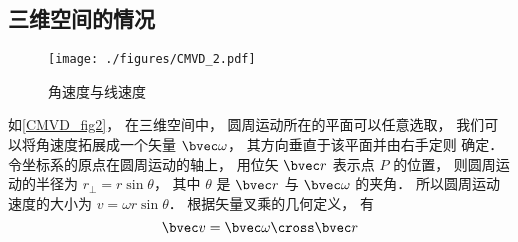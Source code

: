 \subsection{三维空间的情况}

\begin{figure}[ht]
\centering
\texttt{[image: ./figures/CMVD\_2.pdf]}
\caption{角速度与线速度} \label{CMVD_fig2}
\end{figure}

如\autoref{CMVD_fig2}， 在三维空间中， 圆周运动所在的平面可以任意选取， 我们可以将角速度拓展成一个矢量 $\bvec\omega$， 其方向垂直于该平面并由右手定则 确定． 令坐标系的原点在圆周运动的轴上， 用位矢 $\bvec r$ 表示点 $P$ 的位置， 则圆周运动的半径为 $r_\bot = r \sin\theta$， 其中 $\theta$ 是 $\bvec r$ 与 $\bvec \omega$ 的夹角． 所以圆周运动速度的大小为 $v = \omega r \sin\theta$． 根据矢量叉乘的几何定义， 有
\begin{equation}\label{CMVD_eq5}
\bvec v = \bvec\omega \cross \bvec r
\end{equation}
